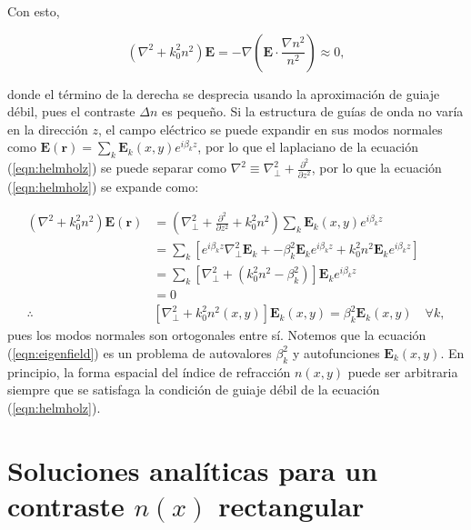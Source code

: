 Con esto, 

\begin{equation}
	(\nabla^2  + k_0^2n^2)\textbf{E} = -\nabla\left(\textbf{E} \cdot \frac{\nabla n^2}{n^2}\right) \approx 0, \label{eqn:helmholz}
\end{equation}

donde el término de la derecha se desprecia usando la aproximación de guiaje débil, pues el contraste $\Delta n$ es pequeño. Si la estructura de guías de onda no varía en la dirección $z$, el campo eléctrico se puede expandir en sus modos normales como $\textbf{E}(\textbf{r}) = \sum_k \textbf{E}_k(x, y) e^{i\beta_k z}$, por lo que el laplaciano de la ecuación (\ref{eqn:helmholz}) se puede separar como $\nabla^2 \equiv \nabla_\perp^2 + \frac{\partial^2}{\partial z^2}$, por lo que la ecuación (\ref{eqn:helmholz}) se expande como:

\begin{align}
	(\nabla^2  + k_0^2n^2) \textbf{E}(\textbf{r}) &= \left(\nabla_\perp^2 + \frac{\partial^2}{\partial z^2} + k_0^2n^2\right)\sum_k \textbf{E}_k(x, y)  e^{i\beta_k z} \nonumber
\\	
	&= \sum_k \left[ e^{i\beta_k z} \nabla_\perp^2 \textbf{E}_k + -\beta_k^2\textbf{E}_k e^{i\beta_k z} + k_0^2n^2 \textbf{E}_k  e^{i\beta_k z}\right]
\nonumber	
	\\	
	&= \sum_k \left[  \nabla_\perp^2  + (k_0^2n^2-\beta_k^2) \right]\textbf{E}_k  e^{i\beta_k z}
	\nonumber	
	\\
	&=
	0
	\nonumber
	\\
	\therefore
	& \left[  \nabla_\perp^2  + k_0^2n^2(x,y) \right]\textbf{E}_k(x,y)  = \beta_k^2 \textbf{E}_k(x,y) \quad \forall k, \label{eqn:eigenfield}
\end{align}
pues los modos normales son ortogonales entre sí.
Notemos que la ecuación (\ref{eqn:eigenfield}) es un problema de autovalores $\beta_k^2$ y autofunciones $\textbf{E}_k(x,y)$. En principio, la forma espacial del índice de refracción $n(x, y)$ puede ser arbitraria siempre que se satisfaga la condición de guiaje débil de la ecuación (\ref{eqn:helmholz}). 

\section{Soluciones analíticas para un contraste $n(x)$ rectangular}

